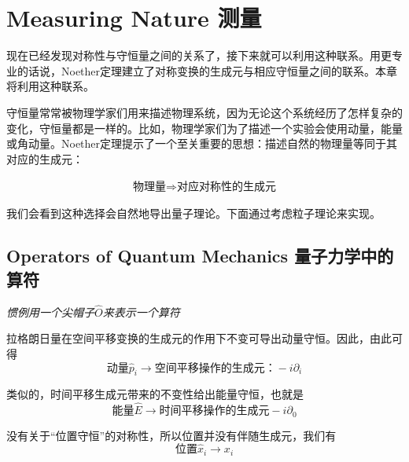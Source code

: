 


\chapter[测量]{Measuring Nature 测量}\label{chap5}

现在已经发现对称性与守恒量之间的关系了，接下来就可以利用这种联系。用更专业的话说，Noether定理建立了对称变换的生成元与相应守恒量之间的联系。本章将利用这种联系。

守恒量常常被物理学家们用来描述物理系统，因为无论这个系统经历了怎样复杂的变化，守恒量都是一样的。比如，物理学家们为了描述一个实验会使用动量，能量或角动量。Noether定理提示了一个至关重要的思想：描述自然的物理量等同于其对应的生成元：

\begin{align}\label{equ5.1}
\text{物理量}\Rightarrow\text{对应对称性的生成元}
\end{align}

我们会看到这种选择会自然地导出量子理论。下面通过考虑粒子理论来实现。

\section[量子力学中的算符]{Operators of Quantum Mechanics 量子力学中的算符}\label{sec5.1}

{\it 惯例用一个尖帽子$\hat{O}$来表示一个算符}

拉格朗日量在空间平移变换的生成元的作用下不变可导出动量守恒。因此，由此可得
\[\text{动量}\hat{p}_i\to\text{空间平移操作的生成元：} - i\partial_i \]

类似的，时间平移生成元带来的不变性给出能量守恒，也就是
\[\text{能量}\hat{E}\to\text{时间平移操作的生成元} - i\partial_0 \]

没有关于``位置守恒''的对称性，所以位置并没有伴随生成元，我们有
\[\text{位置}\hat{x}_i\to x_i \]

